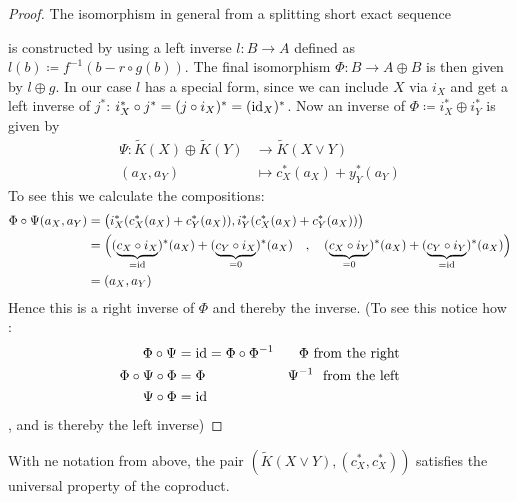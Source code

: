 \begin{proof}
	The isomorphism in general from a splitting short exact sequence 
	\begin{center}
	\end{center}is constructed by using a left inverse $l:B \to A$ defined as $l(b)\coloneq f^{-1}(b-r\circ g(b))$. The final isomorphism $\Phi: B\to A\oplus B$ is then given by $l\oplus g$. In our case $l$ has a special form, since we can include $X$ via $i_X$ and get a left inverse of $j^*$: $i_X^*\circ j^*=(j\circ i_X)^*=(\operatorname{\text{id}}_X)^*$.
	Now an inverse of $\Phi\coloneq i_X^*\oplus i_Y^*$ is given by 
	\begin{align*}
		\Psi: \tilde{K}(X)\oplus \tilde{K}(Y) &\to \tilde{K}(X\vee Y)\\
		(a_X,a_Y)                             &\mapsto c_X^*(a_X)+y_Y^*(a_Y)
	\end{align*}
	To see this we calculate the compositions:
	\begin{align*}
		\Phi\circ \Psi(a_X,a_Y)&=\big( i_X^*(c_X^*(a_X)+c_Y^*(a_X)),i_Y^*(c_X^*(a_X)+c_Y^*(a_X)) \big)\\
		&=\Big( (\underbrace{c_X\circ i_X}_{=\operatorname{\text{id}}})^*(a_X)+(\underbrace{c_Y\circ i_X}_{=0})^*(a_X)\quad , \quad (\underbrace{c_X\circ i_Y}_{=0})^*(a_X)+(\underbrace{c_Y\circ i_Y}_{=\operatorname{\text{id}}})^*(a_X) \Big)\\
		&=(a_X,a_Y)
	\end{align*}
	Hence this is a right inverse of $\Phi$ and thereby the inverse. (To see this notice how :
	\begin{align*}
		\Phi\circ \Psi&=\operatorname{\text{id}}=\Phi\circ \Phi^{-1} &\Phi ~\text{from the right}\\
		\Phi\circ \Psi\circ \Phi &=\Phi & \Psi^{-1}~ \text{ from the left}\\
		\Psi\circ \Phi &=\operatorname{\text{id}}
	\end{align*}, and is thereby the left inverse)
\end{proof}
\begin{cor}
	With ne notation from above, the pair $(\tilde{K}(X\vee Y),(c_X^*,c_X^*))$ satisfies the universal property of the coproduct. 
\end{cor}
